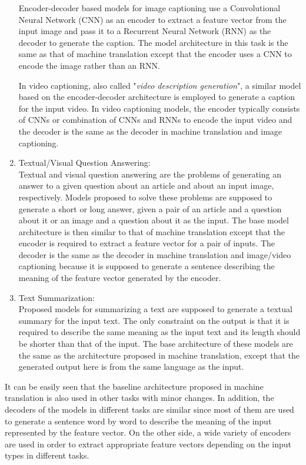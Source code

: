 \documentclass[preprint, 12pt]{elsarticle}
\begin{document}
\begin{enumerate}
			Encoder-decoder based models for image captioning use a Convolutional Neural Network (CNN) as an encoder to extract a feature vector from the input image and pass it to a Recurrent Neural Network (RNN) as the decoder to generate the caption. The model architecture in this task is the same as that of machine translation except that the encoder uses a CNN to encode the image rather than an RNN.
			
			In video captioning, also called "\textit{video description generation}", a similar model based on the encoder-decoder architecture is employed to generate a caption for the input video. In video captioning models, the encoder typically consists of CNNs or combination of CNNs and RNNs to encode the input video and the decoder is the same as the decoder in machine translation and image captioning. 
			
			
			\item Textual/Visual Question Answering:\\
			Textual and visual question answering are the problems of generating an answer to a given question about an article and about an input image, respectively. Models proposed to solve these problems are supposed to generate a short or long answer, given a pair of an article and a question about it or an image and a question about it as the input. The base model architecture is then similar to that of machine translation except that the encoder is required to extract a feature vector for a pair of inputs. The decoder is the same as the decoder in machine translation and image/video captioning because it is supposed to generate a sentence describing the meaning of the feature vector generated by the encoder.
			
			\item Text Summarization:\\
			Proposed models for summarizing a text are supposed to generate a textual summary for the input text. The only constraint on the output is that it is required to describe the same meaning as the input text and its length should be shorter than that of the input. The base architecture of these models are the same as the architecture proposed in machine translation, except that the generated output here is from the same language as the input. 
			
		\end{enumerate}
	
	It can be easily seen that the baseline architecture proposed in machine translation is also used in other tasks with minor changes. In addition, the decoders of the models in different tasks are similar since most of them are used to generate a sentence word by word to describe the meaning of the input represented by the feature  vector. On the other side, a wide variety of encoders are used in order to extract appropriate feature vectors depending on the input types in different tasks. 
	
\end{document}
